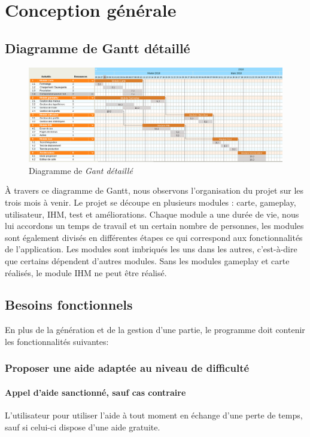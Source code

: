 \documentclass{report}
\begin{document}
\chapter{Conception générale}

    \section{Diagramme de Gantt détaillé}
    
    \begin{figure}[H]
	\caption{Diagramme de \textit{Gant détaillé}}
	\includegraphics[width=17cm]{ganttDetaille.png}
    \end{figure}
   
     À travers ce diagramme de Gantt, nous observons l'organisation du projet sur les trois mois à venir. Le projet se découpe en plusieurs modules : carte, gameplay, utilisateur, IHM, test et améliorations.
    Chaque module a une durée de vie, nous lui accordons un temps de travail et un certain nombre de personnes, les modules sont également divisés en différentes étapes ce qui correspond aux fonctionnalités de l'application. Les modules sont imbriqués les uns dans les autres, c'est-à-dire que certains dépendent d'autres modules. Sans les modules gameplay et carte réalisés, le module IHM ne peut être réalisé. 

   \section{Besoins fonctionnels}
   
    En plus de la génération et de la gestion d'une partie, le programme doit contenir les fonctionnalités suivantes:

 \setcounter{secnumdepth}{5}
 
 	\subsection{Proposer une aide adaptée au niveau de difficulté}
 		\subsubsection{Appel d'aide sanctionné, sauf cas contraire}
 				L'utilisateur pour utiliser l'aide à tout moment en échange d'une perte de temps, sauf si celui-ci dispose d'une aide gratuite.
\end{document}

